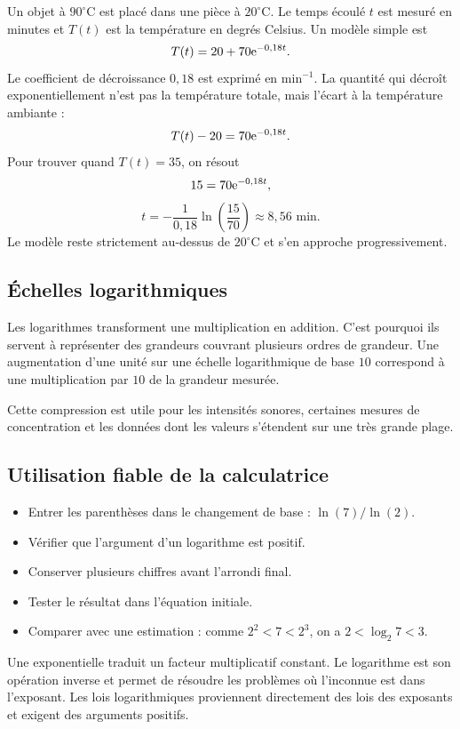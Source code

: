 Un objet à $90^\circ$C est placé dans une pièce à $20^\circ$C. Le temps écoulé $t$ est mesuré en minutes et $T(t)$ est la température en degrés Celsius. Un modèle simple est
\[
T(t)=20+70\mathrm{e}^{-0{,}18t}.
\]
Le coefficient de décroissance $0{,}18$ est exprimé en $\text{min}^{-1}$.
La quantité qui décroît exponentiellement n'est pas la température totale, mais l'écart à la température ambiante :
\[
T(t)-20=70\mathrm{e}^{-0{,}18t}.
\]
Pour trouver quand $T(t)=35$, on résout
\[
15=70\mathrm{e}^{-0{,}18t},
\]
\[
t=-\frac1{0{,}18}\ln\left(\frac{15}{70}\right)\approx8{,}56\text{ min}.
\]
Le modèle reste strictement au-dessus de $20^\circ$C et s'en approche progressivement.

\subsection{Échelles logarithmiques}

Les logarithmes transforment une multiplication en addition. C'est pourquoi ils servent à représenter des grandeurs couvrant plusieurs ordres de grandeur. Une augmentation d'une unité sur une échelle logarithmique de base $10$ correspond à une multiplication par $10$ de la grandeur mesurée.

Cette compression est utile pour les intensités sonores, certaines mesures de concentration et les données dont les valeurs s'étendent sur une très grande plage.

\subsection{Utilisation fiable de la calculatrice}

\begin{itemize}
\item Entrer les parenthèses dans le changement de base : $\ln(7)/\ln(2)$.
\item Vérifier que l'argument d'un logarithme est positif.
\item Conserver plusieurs chiffres avant l'arrondi final.
\item Tester le résultat dans l'équation initiale.
\item Comparer avec une estimation : comme $2^2<7<2^3$, on a $2<\log_2 7<3$.
\end{itemize}

\begin{summarybox}
Une exponentielle traduit un facteur multiplicatif constant. Le logarithme est son opération inverse et permet de résoudre les problèmes où l'inconnue est dans l'exposant. Les lois logarithmiques proviennent directement des lois des exposants et exigent des arguments positifs.
\end{summarybox}
